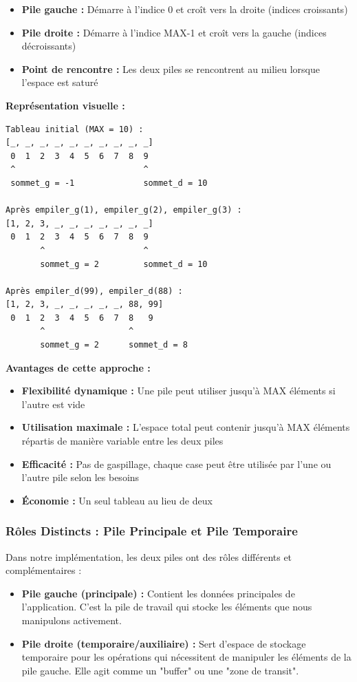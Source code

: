\documentclass[a4paper, 11pt]{article}
\begin{document}
\begin{itemize}
    \item \textbf{Pile gauche :} Démarre à l'indice 0 et croît vers la droite (indices croissants)
    \item \textbf{Pile droite :} Démarre à l'indice MAX-1 et croît vers la gauche (indices décroissants)
    \item \textbf{Point de rencontre :} Les deux piles se rencontrent au milieu lorsque l'espace est saturé
\end{itemize}

\textbf{Représentation visuelle :}
\begin{verbatim}
Tableau initial (MAX = 10) :
[_, _, _, _, _, _, _, _, _, _]
 0  1  2  3  4  5  6  7  8  9
 ^                          ^
 sommet_g = -1              sommet_d = 10

Après empiler_g(1), empiler_g(2), empiler_g(3) :
[1, 2, 3, _, _, _, _, _, _, _]
 0  1  2  3  4  5  6  7  8  9
       ^                    ^
       sommet_g = 2         sommet_d = 10

Après empiler_d(99), empiler_d(88) :
[1, 2, 3, _, _, _, _, _, 88, 99]
 0  1  2  3  4  5  6  7  8   9
       ^                 ^
       sommet_g = 2      sommet_d = 8
\end{verbatim}

\textbf{Avantages de cette approche :}
\begin{itemize}
    \item \textbf{Flexibilité dynamique :} Une pile peut utiliser jusqu'à MAX éléments si l'autre est vide
    \item \textbf{Utilisation maximale :} L'espace total peut contenir jusqu'à MAX éléments répartis de manière variable entre les deux piles
    \item \textbf{Efficacité :} Pas de gaspillage, chaque case peut être utilisée par l'une ou l'autre pile selon les besoins
    \item \textbf{Économie :} Un seul tableau au lieu de deux
\end{itemize}

\subsubsection*{Rôles Distincts : Pile Principale et Pile Temporaire}

Dans notre implémentation, les deux piles ont des rôles différents et complémentaires :

\begin{itemize}
    \item \textbf{Pile gauche (principale) :} Contient les données principales de l'application. C'est la pile de travail qui stocke les éléments que nous manipulons activement.
    \item \textbf{Pile droite (temporaire/auxiliaire) :} Sert d'espace de stockage temporaire pour les opérations qui nécessitent de manipuler les éléments de la pile gauche. Elle agit comme un "buffer" ou une "zone de transit".
\end{itemize}
\end{document}
